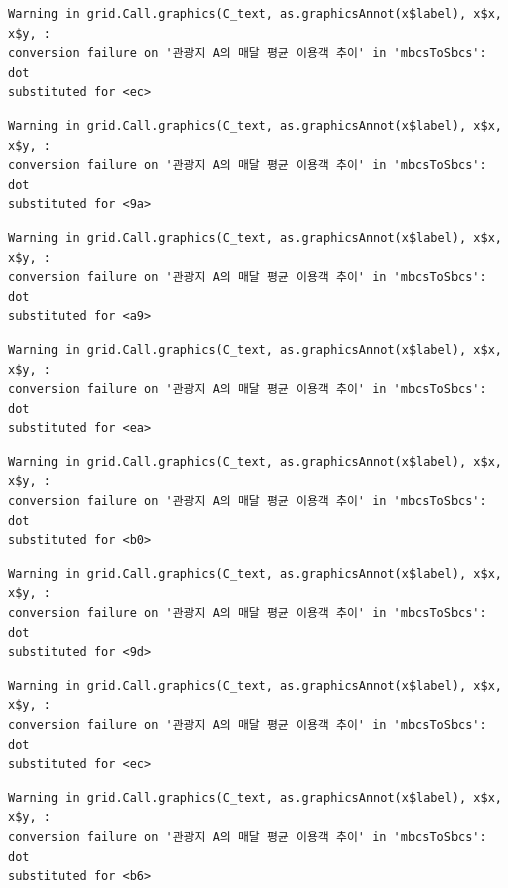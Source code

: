 \documentclass[
  letterpaper,
  DIV=11,
  numbers=noendperiod]{scrreprt}
\begin{document}
\begin{verbatim}
Warning in grid.Call.graphics(C_text, as.graphicsAnnot(x$label), x$x, x$y, :
conversion failure on '관광지 A의 매달 평균 이용객 추이' in 'mbcsToSbcs': dot
substituted for <ec>
\end{verbatim}

\begin{verbatim}
Warning in grid.Call.graphics(C_text, as.graphicsAnnot(x$label), x$x, x$y, :
conversion failure on '관광지 A의 매달 평균 이용객 추이' in 'mbcsToSbcs': dot
substituted for <9a>
\end{verbatim}

\begin{verbatim}
Warning in grid.Call.graphics(C_text, as.graphicsAnnot(x$label), x$x, x$y, :
conversion failure on '관광지 A의 매달 평균 이용객 추이' in 'mbcsToSbcs': dot
substituted for <a9>
\end{verbatim}

\begin{verbatim}
Warning in grid.Call.graphics(C_text, as.graphicsAnnot(x$label), x$x, x$y, :
conversion failure on '관광지 A의 매달 평균 이용객 추이' in 'mbcsToSbcs': dot
substituted for <ea>
\end{verbatim}

\begin{verbatim}
Warning in grid.Call.graphics(C_text, as.graphicsAnnot(x$label), x$x, x$y, :
conversion failure on '관광지 A의 매달 평균 이용객 추이' in 'mbcsToSbcs': dot
substituted for <b0>
\end{verbatim}

\begin{verbatim}
Warning in grid.Call.graphics(C_text, as.graphicsAnnot(x$label), x$x, x$y, :
conversion failure on '관광지 A의 매달 평균 이용객 추이' in 'mbcsToSbcs': dot
substituted for <9d>
\end{verbatim}

\begin{verbatim}
Warning in grid.Call.graphics(C_text, as.graphicsAnnot(x$label), x$x, x$y, :
conversion failure on '관광지 A의 매달 평균 이용객 추이' in 'mbcsToSbcs': dot
substituted for <ec>
\end{verbatim}

\begin{verbatim}
Warning in grid.Call.graphics(C_text, as.graphicsAnnot(x$label), x$x, x$y, :
conversion failure on '관광지 A의 매달 평균 이용객 추이' in 'mbcsToSbcs': dot
substituted for <b6>
\end{verbatim}
\end{document}

